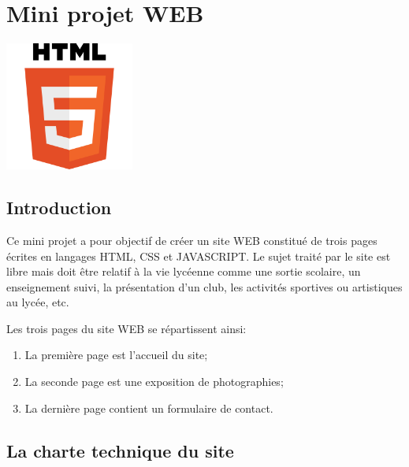 \hypertarget{header}{}
\hypertarget{mini-projet-web}{%
\section{Mini projet WEB}\label{mini-projet-web}}

\includegraphics[width=1.66667in,height=\textheight]{img/html.png}

\hypertarget{content}{}
\hypertarget{introduction}{%
\subsection{Introduction}\label{introduction}}

Ce mini projet a pour objectif de créer un site WEB constitué de trois
pages écrites en langages HTML, CSS et JAVASCRIPT. Le sujet traité par
le site est libre mais doit être relatif à la vie lycéenne comme une
sortie scolaire, un enseignement suivi, la présentation d'un club, les
activités sportives ou artistiques au lycée, etc.

Les trois pages du site WEB se répartissent ainsi:

\begin{enumerate}
\tightlist
\item
  La première page est l'accueil du site;
\item
  La seconde page est une exposition de photographies;
\item
  La dernière page contient un formulaire de contact.
\end{enumerate}

\hypertarget{la-charte-technique-du-site}{%
\subsection{La charte technique du
site}\label{la-charte-technique-du-site}}

